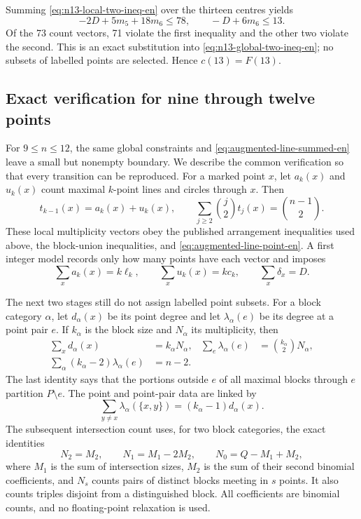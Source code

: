 \documentclass[11pt,a4paper]{article}
\theoremstyle{definition}
\begin{document}
Summing \eqref{eq:n13-local-two-ineq-en} over the thirteen centres yields
\begin{equation}\label{eq:n13-global-two-ineq-en}
 -2D+5m_5+18m_6\le78,
 \qquad -D+6m_6\le13.
\end{equation}
Of the 73 count vectors, 71 violate the first inequality and the other two
violate the second.  This is an exact substitution into
\eqref{eq:n13-global-two-ineq-en}; no subsets of labelled points are selected.  Hence
$c(13)=F(13)$.

\subsection{Exact verification for nine through twelve points}

For $9\le n\le12$, the same global constraints and
\eqref{eq:augmented-line-summed-en} leave a small but nonempty boundary.  We
describe the common verification so that every transition can be reproduced.
For a marked point $x$, let $a_k(x)$ and $u_k(x)$ count maximal $k$-point
lines and circles through $x$.  Then
\[
 t_{k-1}(x)=a_k(x)+u_k(x),
 \qquad
 \sum_{j\ge2}\binom j2t_j(x)=\binom{n-1}{2}.
\]
These local multiplicity vectors obey the published arrangement inequalities used above, the
block-union inequalities, and \eqref{eq:augmented-line-point-en}.  A first
integer model records only how many points have each vector and imposes
\[
 \sum_xa_k(x)=k\ell_k,\qquad
 \sum_xu_k(x)=kc_k,\qquad
 \sum_x\delta_x=D.
\]

The next two stages still do not assign labelled point subsets.  For a block category
$\alpha$, let $d_\alpha(x)$ be its point degree and let
$\lambda_\alpha(e)$ be its degree at a point pair $e$.  If $k_\alpha$ is the
block size and $N_\alpha$ its multiplicity, then
\begin{align}
 \sum_xd_\alpha(x)&=k_\alpha N_\alpha,&
 \sum_e\lambda_\alpha(e)&=\binom{k_\alpha}{2}N_\alpha,
 \label{eq:small-category-totals-en}\\
 \sum_\alpha(k_\alpha-2)\lambda_\alpha(e)&=n-2.
 \label{eq:small-pair-profile2-en}
\end{align}
The last identity says that the portions outside $e$ of all maximal blocks
through $e$ partition $P\setminus e$.  The point and point-pair data are linked by
\[
 \sum_{y\ne x}\lambda_\alpha(\{x,y\})=(k_\alpha-1)d_\alpha(x).
\]
The subsequent intersection count uses,
for two block categories, the exact identities
\[
 N_2=M_2,\qquad N_1=M_1-2M_2,\qquad N_0=Q-M_1+M_2,
\]
where $M_1$ is the sum of intersection sizes, $M_2$ is the sum of their second
binomial coefficients, and $N_s$ counts pairs of
distinct blocks meeting in $s$ points.  It also counts triples disjoint from
a distinguished block.  All coefficients are binomial counts, and no
floating-point relaxation is used.
\end{document}
